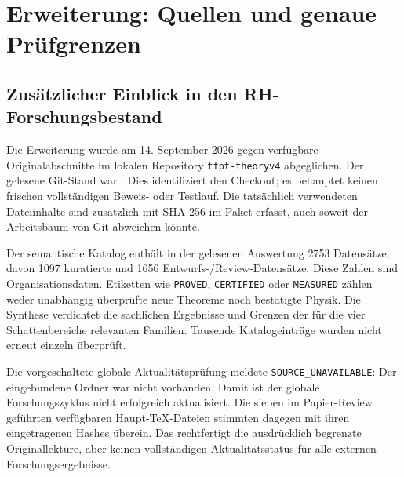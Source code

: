 \chapter{Erweiterung: Quellen und genaue Prüfgrenzen}
\label{app:shadow-sources}
\section{Zusätzlicher Einblick in den RH-Forschungsbestand}
Die Erweiterung wurde am 14. September 2026 gegen verfügbare Originalabschnitte im lokalen Repository \texttt{tfpt-theoryv4} abgeglichen. Der gelesene Git-Stand war . Dies identifiziert den Checkout; es behauptet keinen frischen vollständigen Beweis- oder Testlauf. Die tatsächlich verwendeten Dateiinhalte sind zusätzlich mit SHA-256 im Paket erfasst, auch soweit der Arbeitsbaum von Git abweichen könnte.

Der semantische Katalog enthält in der gelesenen Auswertung 2753 Datensätze, davon 1097 kuratierte und 1656 Entwurfs-/Review-Datensätze. Diese Zahlen sind Organisationsdaten. Etiketten wie \texttt{PROVED}, \texttt{CERTIFIED} oder \texttt{MEASURED} zählen weder unabhängig überprüfte neue Theoreme noch bestätigte Physik. Die Synthese verdichtet die sachlichen Ergebnisse und Grenzen der für die vier Schattenbereiche relevanten Familien. Tausende Katalogeinträge wurden nicht erneut einzeln überprüft.

Die vorgeschaltete globale Aktualitätsprüfung meldete \texttt{SOURCE\_UNAVAILABLE}: Der eingebundene Ordner  war nicht vorhanden. Damit ist der globale Forschungszyklus nicht erfolgreich aktualisiert. Die sieben im Papier-Review geführten verfügbaren Haupt-TeX-Dateien stimmten dagegen mit ihren eingetragenen Hashes überein. Das rechtfertigt die ausdrücklich begrenzte Originallektüre, aber keinen vollständigen Aktualitätsstatus für alle externen Forschungsergebnisse.

